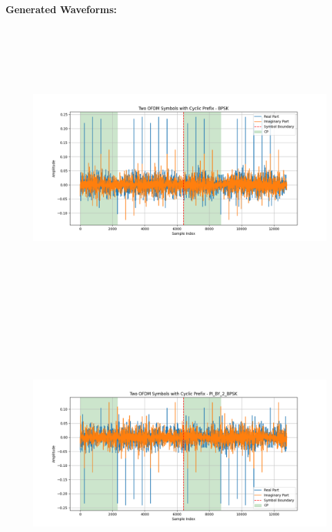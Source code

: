 \documentclass[letterpaper, 11pt]{article}
\newcommand{\secHeader}[1]{\vspace{2mm} \noindent \textbf{#1:}\vspace{-4mm}}
\begin{document}
\newpage
\secHeader{Generated Waveforms}
\begin{figure}[h!]
    \centering
    \includegraphics[width=\textwidth,height=4.25in]{BPSK.png}
    \includegraphics[width=\textwidth,height=4.25in]{PIBPSK.png}
\end{figure}
\end{document}
